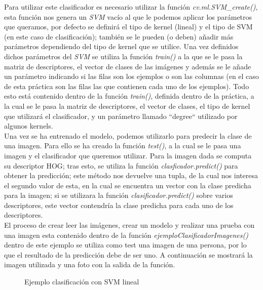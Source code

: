 Para utilizar este clasificador es necesario utilizar la función \textit{cv.ml.SVM\_create()}, esta función nos genera un \textit{SVM} vacío al que le podemos aplicar los parámetros que queramos, por defecto se definirá el tipo de kernel (lineal) y el tipo de SVM (en este caso de clasificación); también se le pueden (o deben) añadir más parámetros dependiendo del tipo de kernel que se utilice. Una vez definidos dichos parámetros del \textit{SVM} se utiliza la función \textit{train()} a la que se le pasa la matriz de descriptores, el vector de clases de las imágenes y además se le añade un parámetro indicando si las filas son los ejemplos o son las columnas (en el caso de esta práctica son las filas las que contienen cada uno de los ejemplos). Todo esto está contenido dentro de la función \textit{train()}, definida dentro de la práctica, a la cual se le pasa la matriz de descriptores, el vector de clases, el tipo de kernel que utilizará el clasificador, y un parámetro llamado ``degree`` utilizado por algunos kernels. \\

Una vez se ha entrenado el modelo, podemos utilizarlo para predecir la clase de una imagen. Para ello se ha creado la función \textit{test()}, a la cual se le pasa una imagen y el clasificador que queremos utilizar. Para la imagen dada se computa su descriptor HOG; tras esto, se utiliza la función \textit{clasficador.predict()} para obtener la predicción; este método nos devuelve una tupla, de la cual nos interesa el segundo valor de esta, en la cual se encuentra un vector con la clase predicha para la imagen; si se utilizara la función \textit{clasificador.predict()} sobre varios descriptores, este vector contendría la clase predicha para cada uno de los descriptores. \\

El proceso de crear leer las imágenes, crear un modelo y realizar una prueba con una imagen esta contenido dentro de la función \textit{ejemploClasificadorImagenes()} dentro de este ejemplo se utiliza como test una imagen de una persona, por lo que el resultado de la predicción debe de ser uno. A continuación se mostrará la imagen utilizada y una foto con la salida de la función. \\

\newpage

\begin{figure}[H]
	\centering
	\caption{Ejemplo clasificación con SVM lineal}
	\label{fig:salida_1}
\end{figure}

